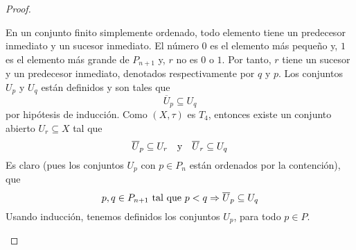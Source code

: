 \documentclass[12pt]{report}
\newcounter{it}
\theoremstyle{largebreak}
\newcommand{\Cls}[1]{\ensuremath{\overline{#1}}}
\begin{document}
\begin{proof}
\begin{enumerate}
            En un conjunto finito simplemente ordenado, todo elemento tiene un predecesor inmediato y un sucesor inmediato. El número $0$ es el elemento más pequeño y, $1$ es el elemento más grande de $P_{n+1}$ y, $r$ no es $0$ o $1$. Por tanto, $r$ tiene un sucesor y un predecesor inmediato, denotados respectivamente por $q$ y $p$. Los conjuntos $U_p$ y $U_q$ están definidos y son tales que
            \begin{equation*}
                \Cls{U}_p\subseteq U_q
            \end{equation*}
            por hipótesis de inducción. Como $(X,\tau)$ es $T_4$, entonces existe un conjunto abierto $U_r\subseteq X$ tal que
            \begin{equation*}
                \Cls{U}_p\subseteq U_r\quad\textup{y}\quad\Cls{U}_r\subseteq U_q
            \end{equation*}
            Es claro (pues los conjuntos $U_p$ con $p\in P_n$ están ordenados por la contención), que
            \begin{equation*}
                p,q\in P_{ n+1}\textup{ tal que }p<q\Rightarrow \Cls{U}_p\subseteq U_q
            \end{equation*}
            Usando inducción, tenemos definidos los conjuntos $U_p$, para todo $p\in P$.


\end{enumerate}
\end{proof}
\end{document}
